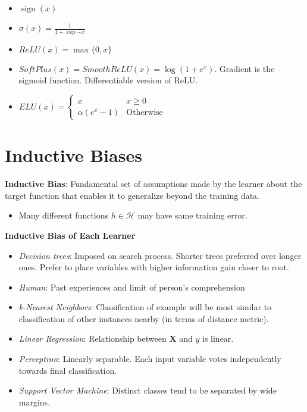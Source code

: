 \documentclass[10pt]{article}
\DeclareMathOperator*{\sign}{sign}
\begin{document}
\begin{multicols}{3}
  \begin{itemize}
    \item $\sign(x)$
    \item $\sigma(x) = \frac{1}{1+\exp{-x}}$
    \item $ReLU(x) = \max\{0,x\}$
    \item $SoftPlus(x) = SmoothReLU(x) = \log(1+e^{x})$. Gradient is the sigmoid function. Differentiable version of ReLU\@.
    \item $ELU(x)= \begin{cases}
                      x & x \geq 0 \\
                      \alpha(e^{x} - 1) & \text{Otherwise}
                    \end{cases}$
  \end{itemize}

  \section*{Inductive Biases}

  \textbf{Inductive Bias}: Fundamental set of assumptions made by the learner about the target function that enables it to generalize beyond the training data.
  \begin{itemize}
    \item Many different functions $h\in\mathcal{H}$ may have same training error.
  \end{itemize}

  \textbf{Inductive Bias of Each Learner}
  \begin{itemize}
    \item \textit{Decision trees}: Imposed on search process. Shorter trees preferred over longer ones. Prefer to place variables with higher information gain closer to root.
    \item \textit{Human}: Past experiences and limit of person's comprehension
    \item \textit{k-Nearest Neighbors}: Classification of example will be most similar to classification of other instances nearby (in terms of distance metric).
    \item \textit{Linear Regression}: Relationship between $\mathbf{X}$ and $y$ is linear.
    \item \textit{Perceptron}: Linearly separable.  Each input variable votes independently towards final classification.
    \item \textit{Support Vector Machine}: Distinct classes tend to be separated by wide margins.
  \end{itemize}


\end{multicols}
\end{document}
